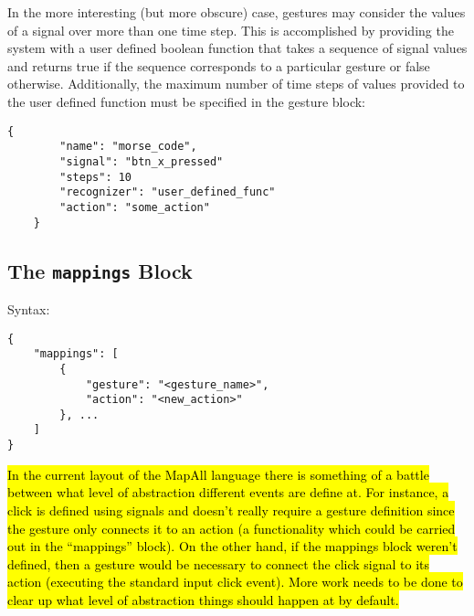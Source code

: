 \documentclass{article}
\begin{document}
In the more interesting (but more obscure) case, gestures may consider the values of a signal over more than one time step. This is accomplished by providing the system with a user defined boolean function that takes a sequence of signal values and returns true if the sequence corresponds to a particular gesture or false otherwise. Additionally, the maximum number of time steps of values provided to the user defined function must be specified in the gesture block:

\begin{Verbatim}[baselinestretch=1.0]
    {
        "name": "morse_code",
        "signal": "btn_x_pressed"
        "steps": 10
        "recognizer": "user_defined_func"
        "action": "some_action"
    }
\end{Verbatim}

\subsection{The \texttt{mappings} Block}
Syntax:

\begin{Verbatim}[baselinestretch=1.0]
{
    "mappings": [
        {
            "gesture": "<gesture_name>",
            "action": "<new_action>"
        }, ...
    ]
}
\end{Verbatim}

\hl{In the current layout of the MapAll language there is something of a battle between what level of abstraction different events are define at. For instance, a click is defined using signals and doesn't really require a gesture definition since the gesture only connects it to an action (a functionality which could be carried out in the ``mappings'' block). On the other hand, if the mappings block weren't defined, then a gesture would be necessary to connect the click signal to its action (executing the standard input click event). More work needs to be done to clear up what level of abstraction things should happen at by default.}


 
\end{document}
